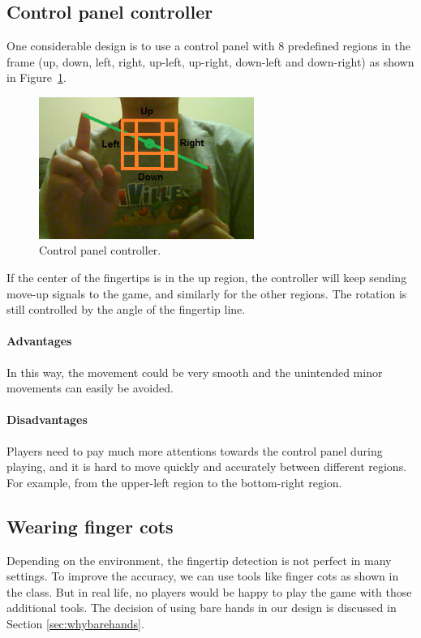 \documentclass[10pt,twocolumn,letterpaper]{article}
\begin{document}
\subsection{Control panel controller}
One considerable design is to use a control panel with 8 predefined regions 
in the frame (up, down, left, right, up-left, up-right, down-left and down-right) 
as shown in Figure~\ref{fig:controlpanel}.

\begin{figure}[h]
\centering
\includegraphics[width=7cm]{controlpanel.png}
\caption{Control panel controller.}
\label{fig:controlpanel}
\end{figure}

If the center of the fingertips is in the up region, the controller 
will keep sending move-up signals to the game, and similarly for the other 
regions. The rotation is still controlled by the angle of the fingertip line.
\paragraph{Advantages}
In this way, the movement could be very smooth and the unintended minor movements can easily be avoided.
\paragraph{Disadvantages}
Players need to pay much more attentions towards the control panel 
during playing, and it is hard to move quickly and accurately between 
different regions. For example, from the upper-left region to the bottom-right region.

\subsection{Wearing finger cots}
Depending on the environment, the fingertip detection is not perfect in many settings. 
To improve the accuracy, we can use tools like finger cots as shown in the class. 
But in real life, no players would be happy to play the game with those additional tools. 
The decision of using bare hands in our design is discussed in Section \ref{sec:whybarehands}.
\end{document}
